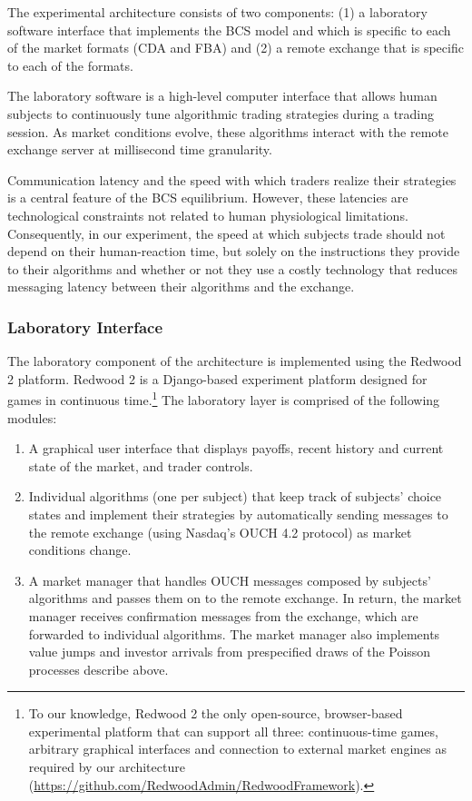 \documentclass[12pt]{article}
\begin{document}
The experimental architecture consists of two components: (1) a laboratory software interface that implements the BCS model and which is specific to each of the market formats (CDA and FBA) and (2) a remote exchange that is specific to each of the formats.

The laboratory software is a high-level computer interface that allows human subjects to continuously tune algorithmic trading strategies during a trading session. As market conditions evolve, these algorithms interact with the remote exchange server at millisecond time granularity. 

Communication latency and the speed with which traders realize their strategies is a central feature of the BCS equilibrium. However, these latencies are technological constraints not related to human physiological limitations. Consequently, in our experiment, the speed at which subjects trade should not depend on their human-reaction time, but solely on the instructions they provide to their algorithms and whether or not they use a costly technology that reduces messaging latency between their algorithms and the exchange.

\subsubsection{Laboratory Interface}
The laboratory component of the architecture is implemented using the Redwood 2 platform. Redwood 2 is a Django-based experiment platform designed for games in continuous time.\footnote{To our knowledge, Redwood 2 the only open-source, browser-based experimental platform that can support all three: continuous-time games, arbitrary graphical interfaces and connection to external market engines as required by our architecture (\url{https://github.com/RedwoodAdmin/RedwoodFramework}).}  The laboratory layer is comprised of the following modules: 
\begin{enumerate}
\item A graphical user interface that displays payoffs, recent history and current state of the market, and trader controls.
\item Individual algorithms (one per subject) that keep track of subjects' choice states and implement their strategies by automatically sending messages to the remote exchange (using Nasdaq's OUCH 4.2 protocol) as market conditions change.
\item A market manager that handles OUCH messages composed by subjects' algorithms and passes them on to the remote exchange. In return, the market manager receives confirmation messages from the exchange, which are forwarded to individual algorithms. The market manager also implements value jumps and investor arrivals from prespecified draws of the Poisson processes describe above.
\end{enumerate}
\end{document}
